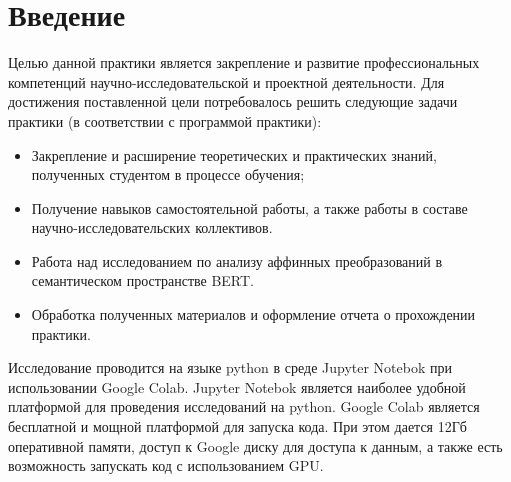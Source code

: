 \documentclass[a4paper,14pt]{article}
\begin{document}
	 
	
	\tableofcontents
	
	\pagebreak
	
	
	
	
	
	
	
	
	
	\section{Введение}
	
	Целью данной практики является закрепление и развитие профессиональных компетенций научно-исследовательской и проектной деятельности.
	Для достижения поставленной цели потребовалось решить следующие задачи практики (в соответствии с программой практики):
	
	\begin{itemize}
	
		\item Закрепление и расширение теоретических и практических знаний, полученных студентом в процессе обучения;
		
		\item Получение навыков самостоятельной работы, а также работы в составе научно-исследовательских коллективов.
		
		\item Работа над исследованием по анализу аффинных преобразований в семантическом пространстве BERT.
		
		\item Обработка полученных материалов и оформление отчета о прохождении практики.
			
	\end{itemize}

	Исследование проводится на языке python в среде Jupyter Notebok при использовании Google Colab. Jupyter Notebok является наиболее удобной платформой для проведения исследований на python.
	Google Colab является бесплатной и мощной платформой для запуска кода.
	При этом дается 12Гб оперативной памяти, доступ к Google диску для доступа к данным, а также есть возможность запускать код с использованием GPU.
	
\end{document}
